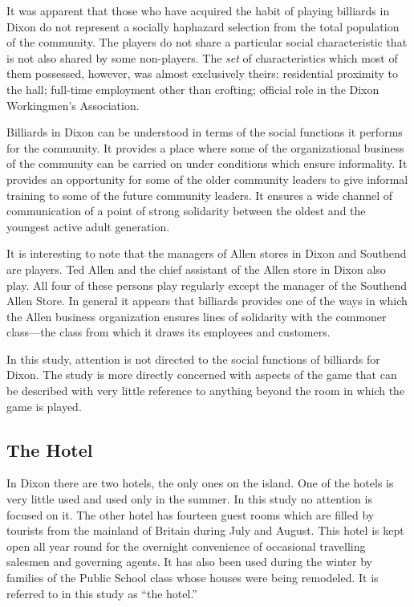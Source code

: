 \documentclass[twoside,symmetric,nobib,justified]{tufte-book}
\begin{document}
It was apparent that those who have acquired the habit of playing
billiards in Dixon do not represent a socially haphazard selection from
the total population of the community. The players do not share a
particular social characteristic that is not also shared by some
non-players. The \emph{set} of characteristics which most of them
possessed, however, was almost exclusively theirs: residential proximity
to the hall; full-time employment other than crofting; official role in
the Dixon Workingmen's Association.

Billiards in Dixon can be understood in terms of the social functions it
performs for the community. It provides a place where some of the
organizational business of the community can be carried on under
conditions which ensure informality. It provides an opportunity for some
of the older community leaders to give informal training to some of the
future community leaders. It ensures a wide channel of communication of
a point of strong solidarity between the oldest and the youngest active
adult generation.

It is interesting to note that the managers of Allen stores in Dixon and
Southend are players. Ted Allen and the chief assistant of the Allen
store in Dixon also play. All four of these persons play regularly
except the manager of the Southend Allen Store. In general it appears
that billiards provides one of the ways in which the Allen business
organization ensures lines of solidarity with the commoner class---the
class from which it draws its employees and customers.

In this study, attention is not directed to the social functions of
billiards for Dixon. The study is more directly concerned with aspects
of the game that can be described with very little reference to anything
beyond the room in which the game is played.

\hypertarget{the-hotel}{%
\subsection{The Hotel}\label{the-hotel}}

In Dixon there are two hotels, the only ones on the island. One of the
hotels is very little used and used only in the summer. In this study no
attention is focused on it. The other hotel has fourteen guest rooms
which are filled by tourists from the mainland of Britain during July
and August. This hotel is kept open all year round for the overnight
convenience of occasional travelling salesmen and governing agents. It
has also been used during the winter by families of the Public School
class whose houses were being remodeled. It is referred to in this study
as ``the hotel.''
\end{document}
